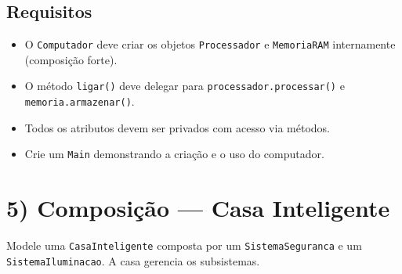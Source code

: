 \documentclass[12pt]{article}
\begin{document}
\subsection*{Requisitos}
\begin{itemize}
    \item O \texttt{Computador} deve criar os objetos \texttt{Processador} e \texttt{MemoriaRAM} internamente (composição forte).
    \item O método \texttt{ligar()} deve delegar para \texttt{processador.processar()} e \texttt{memoria.armazenar()}.
    \item Todos os atributos devem ser privados com acesso via métodos.
    \item Crie um \texttt{Main} demonstrando a criação e o uso do computador.
\end{itemize}

\section*{5) Composição — Casa Inteligente}
Modele uma \texttt{CasaInteligente} composta por um \texttt{SistemaSeguranca} e um \texttt{SistemaIluminacao}. A casa gerencia os subsistemas.
\end{document}
